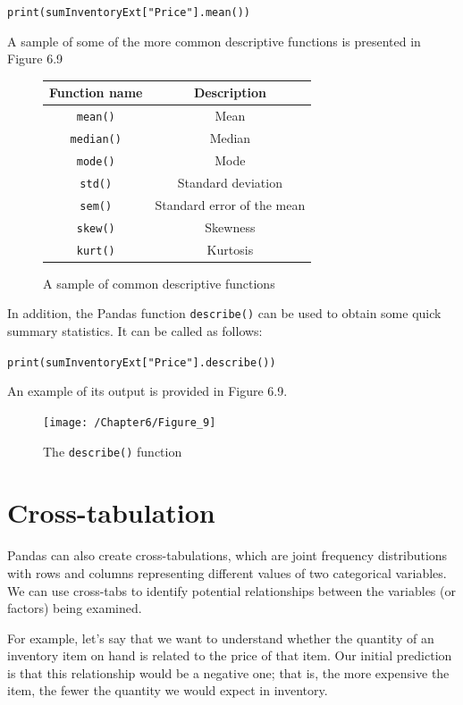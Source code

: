 \documentclass{book}
\begin{document}
\texttt{print(sumInventoryExt["Price"].mean())}

A sample of some of the more common descriptive functions is presented in Figure 6.9

\begin{figure}[h]
	\caption{A sample of common descriptive functions}
	\centering
	\begin{center}
		\begin{tabular}{|c | c|}
			\hline Function name & Description  \\ [0.5ex]
			\hline
			\texttt{mean()} & Mean \\
			\hline
			\texttt{median()} & Median \\
			\hline
			\texttt{mode()} & Mode \\
			\hline
			\texttt{std()} & Standard deviation  \\
			\hline
			\texttt{sem()} & Standard error of the mean \\
			\hline
			\texttt{skew()} & Skewness  \\
			\hline
			\texttt{kurt()} & Kurtosis  \\
			\hline
		\end{tabular}
	\end{center}
\end{figure}

In addition, the Pandas function \texttt{describe()} can be used to obtain some quick summary statistics. It can be called as follows:

\texttt{print(sumInventoryExt["Price"].describe())}

An example of its output is provided in Figure 6.9.

\begin{figure}[h]
	\caption{The \texttt{describe()} function}
	\centering\texttt{[image: /Chapter6/Figure\_9]}
\end{figure}

\section{Cross-tabulation}

Pandas can also create cross-tabulations, which are joint frequency distributions with rows and columns representing different values of two categorical variables. We can use cross-tabs to identify potential relationships between the variables (or factors) being examined. 

For example, let's say that we want to understand whether the quantity of an inventory item on hand is related to the price of that item. Our initial prediction is that this relationship would be a negative one; that is, the more expensive the item, the fewer the quantity we would expect in inventory. 
\end{document}

